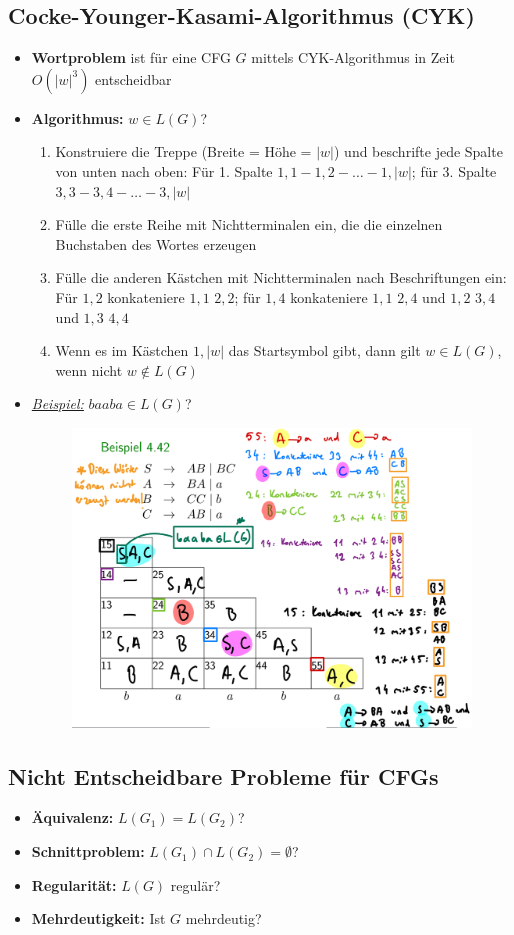 \documentclass[ieeetran]{article}
\begin{document}
\subsection{Cocke-Younger-Kasami-Algorithmus (CYK)} %
\label{sub:cocke_younger_kasami_algorithmus_cYK_}
\begin{itemize}
  \item \textbf{Wortproblem} ist für eine CFG $G$ mittels CYK-Algorithmus in Zeit $O(|w|^3)$ entscheidbar
	\item \textbf{Algorithmus:} $w \in L(G)$?
		\begin{enumerate}
		  \item Konstruiere die Treppe (Breite = Höhe = $|w|$) und beschrifte jede Spalte von unten nach oben: Für 1. Spalte $1,1-1,2-\ldots-1,|w|$; für 3. Spalte $3,3-3,4-\ldots-3,|w|$
		\item Fülle die erste Reihe mit Nichtterminalen ein, die die einzelnen Buchstaben des Wortes erzeugen
		\item Fülle die anderen Kästchen mit Nichtterminalen nach Beschriftungen ein: Für $1,2$ konkateniere $1,1$ $2,2$; für $1,4$ konkateniere $1,1$ $2,4$ und $1,2$ $3,4$ und $1,3$ $4,4$
		\item Wenn es im Kästchen $1, |w|$ das Startsymbol gibt, dann gilt $w \in L(G)$, wenn nicht $w \not\in L(G)$

		\end{enumerate}

	\item \textit{\underline{Beispiel:}} $baaba \in L(G)$?
		\begin{figure}[h!]
		  \centering
		  \includegraphics[width=0.5\linewidth]{cykexample}
		  \label{fig:cykexample}
		\end{figure}
\end{itemize}

\subsection{Nicht Entscheidbare Probleme für CFGs} %
\label{sub:nicht_entscheidbare_probleme_für_cFGs}
\begin{itemize}
  \item \textbf{Äquivalenz:} $L(G_1) = L(G_2)$?
\item \textbf{Schnittproblem:} $L(G_1) \cap L(G_2) = \emptyset$?
\item \textbf{Regularität:} $L(G)$ regulär?
\item \textbf{Mehrdeutigkeit:} Ist $G$ mehrdeutig?
\end{itemize}
\end{document}
